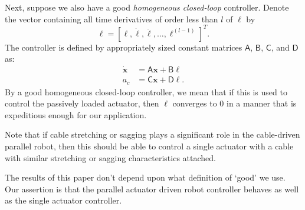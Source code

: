 \documentclass[oneside,twocolumn,reqno]{amsart}
\newcommand\tint{{\textstyle\int\!}}
\begin{document}
Next, suppose we also have a good \emph{homogeneous closed-loop} controller.  Denote the vector containing all time derivatives of order less than $l$ of $\ell$ by
\begin{equation}\bm \ell = [\ell, \dot \ell, \ddot \ell, \dots, \ell^{(l-1)}]^T .
\end{equation}
The controller is defined by appropriately sized constant matrices $\mathsf A$, $\mathsf B$, $\mathsf C$, and $\mathsf D$ as:
\begin{align}
\label{hom closed-loop}
\dot {\bm x} &= \mathsf A \bm x + \mathsf B \ell \\
\label{hom closed-loop 2}
a_c &= \mathsf C \bm x + \mathsf D \bm \ell.
\end{align}
By a good homogeneous closed-loop controller, we mean that if this is used to control the passively loaded actuator, then $\ell$ converges to $0$ in a manner that is expeditious enough for our application.


Note that if cable stretching or sagging plays a significant role in the cable-driven parallel robot, then this should be able to control a single actuator with a cable with similar stretching or sagging characteristics attached.

The results of this paper don't depend upon what definition of `good' we use.  Our assertion is that the parallel actuator driven robot controller behaves as well as the single actuator controller.
\end{document}
